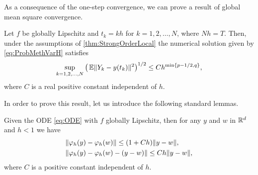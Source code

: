\documentclass[final,onefignum,onetabnum]{siamonline171218}
\begin{document}
As a consequence of the one-step convergence, we can prove a result of global mean square convergence.
\begin{theorem}\label{thm:StrongOrder} Let $f$ be globally Lipschitz and $t_k = kh$ for $k = 1, 2, \ldots, N$, where $Nh = T$. Then, under the assumptions of \cref{thm:StrongOrderLocal} the numerical solution given by \eqref{eq:ProbMethVarH} satisfies 
	\begin{equation}\label{eq:StrongGlobalClaim}
		\sup_{k=1,2, \ldots, N} \big(\E\norm{Y_k - y(t_k)}^2\big)^{1/2} \leq C h^{\min\{p-1/2, q\}},
	\end{equation}
	where $C$ is a real positive constant independent of $h$.
\end{theorem}
In order to prove this result, let us introduce the following standard lemmas.
\begin{lemma}\label{lem:ODERepresentation} Given the ODE \eqref{eq:ODE} with $f$ globally Lipschitz, then for any $y$ and $w$ in $\mathbb{R}^d$ and $h < 1$ we have
	\begin{align}
		&\lVert\varphi_h(y) - \varphi_h(w)\rVert \leq (1 + Ch) \lVert y - w\rVert,\\
		&\lVert\varphi_h(y) - \varphi_h(w) - (y - w)\rVert \leq Ch\lVert y - w\rVert,
	\end{align}
	where $C$ is a positive constant independent of $h$.
\end{lemma}
\end{document}
